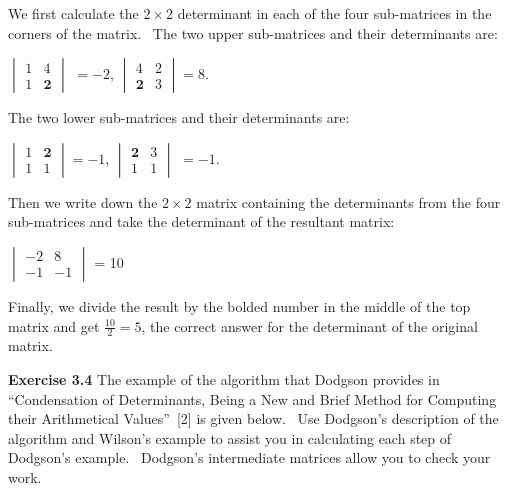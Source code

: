 \documentclass[11pt]{article}%
\theoremstyle{definition}
\begin{document}
We first calculate the $2\times2$ determinant in each of the four sub-matrices
in the corners of the matrix. \ The two upper sub-matrices and their
determinants are:

\begin{center}
$%
\begin{vmatrix}
1 & 4\\
1 & \mathbf{2}%
\end{vmatrix}
$ $=-2$, $%
\begin{vmatrix}
4 & 2\\
\mathbf{2} & 3
\end{vmatrix}
=8$.
\end{center}

The two lower sub-matrices and their determinants are:

\begin{center}
$%
\begin{vmatrix}
1 & \boldsymbol{2}\\
1 & 1
\end{vmatrix}
=-1$, $%
\begin{vmatrix}
\mathbf{2} & 3\\
1 & 1
\end{vmatrix}
$ $=-1.$
\end{center}

\bigskip

Then we write down the $2\times2$ matrix containing the determinants from the
four sub-matrices and take the determinant of the resultant matrix:

\begin{center}
$%
\begin{vmatrix}
-2 & 8\\
-1 & -1
\end{vmatrix}
$ = 10
\end{center}

Finally, we divide the result by the bolded number in the middle of the top
matrix and get $\frac{10}{2}=5$, the correct answer for the determinant of the
original matrix. \ 

\bigskip

\noindent\textbf{Exercise 3.4} The example of the algorithm that Dodgson
provides in \textquotedblleft Condensation of Determinants, Being a New and
Brief Method for Computing their Arithmetical Values\textquotedblright\ [2] is
given below. \ Use Dodgson's description of the algorithm and Wilson's example
to assist you in calculating each step of Dodgson's example. \ Dodgson's
intermediate matrices allow you to check your work.%
\end{document}

